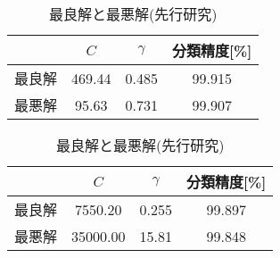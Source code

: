 \begin{table}[tb]
  \begin{minipage}{0.45\textwidth}  %
      \centering
      \caption{最良解と最悪解(提案手法)}  %
      \begin{tabular}{|c|c|c|c|}  %
          \hline  %
          &$C$ &$\gamma$ &分類精度[\%] \\  %
          \hline  %
        最良解&469.44&0.485&99.915\\  %
          \hline  %
        最悪解 &95.63 &0.731&99.907\\  %
          \hline  %
      \end{tabular}
      \label{myparam1}  %
  \end{minipage} \hspace{1cm}  %
  \begin{minipage}{0.45\textwidth}  %
      \centering
      \caption{最良解と最悪解(先行研究)}  %
      \begin{tabular}{|c|c|c|c|}  %
          \hline  %
          &$C$ &$\gamma$ &分類精度[\%] \\  %
          \hline  %
        最良解 &7550.20& 0.255&99.897 \\  %
          \hline  %
        最悪解  &35000.00&15.81 &99.848\\  %
          \hline  %
      \end{tabular}
      \label{myparam2}  %
  \end{minipage}
\end{table}



